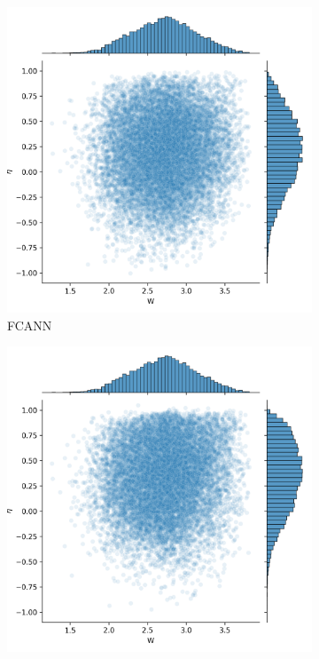 \begin{figure}
	\centering
	\begin{subfigure}{0.32\textwidth}
		\centering
		\includegraphics[width=\textwidth]{img/work_dist_n5_eigen_ann}
		\caption{FCANN}
		\label{}
	\end{subfigure}
	\begin{subfigure}{0.32\textwidth}
		\centering
		\includegraphics[width=\textwidth]{img/work_dist_n5_eigen_bi}

\end{subfigure}
\end{figure}
